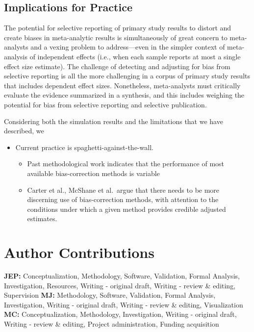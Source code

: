 \documentclass[
  man, donotrepeattitle,floatsintext]{apa7}
\providecommand{\tightlist}{%
  \setlength{\itemsep}{0pt}\setlength{\parskip}{0pt}}
\begin{document}
\subsection{Implications for Practice}\label{implications-for-practice}

The potential for selective reporting of primary study results to distort and create biases in meta-analytic results is simultaneously of great concern to meta-analysts and a vexing problem to address---even in the simpler context of meta-analysis of independent effects (i.e., when each sample reports at most a single effect size estimate).
The challenge of detecting and adjusting for bias from selective reporting is all the more challenging in a corpus of primary study results that includes dependent effect sizes.
Nonetheless, meta-analysts must critically evaluate the evidence summarized in a synthesis, and this includes weighing the potential for bias from selective reporting and selective publication.

Considering both the simulation results and the limitations that we have described, we

\begin{itemize}
\tightlist
\item
  Current practice is spaghetti-against-the-wall.

  \begin{itemize}
  \tightlist
  \item
    Past methodological work indicates that the performance of most available bias-correction methods is variable
  \item
    Carter et al., McShane et al.~argue that there needs to be more discerning use of bias-correction methods, with attention to the conditions under which a given method provides credible adjusted estimates.
  \end{itemize}
\end{itemize}

\section*{Author Contributions}\label{author-contributions}

\textbf{JEP:} Conceptualization, Methodology, Software, Validation, Formal Analysis, Investigation, Resources, Writing - original draft, Writing - review \& editing, Supervision \textbf{MJ:} Methodology, Software, Validation, Formal Analysis, Investigation, Writing - original draft, Writing - review \& editing, Visualization \textbf{MC:} Conceptualization, Methodology, Investigation, Writing - original draft, Writing - review \& editing, Project administration, Funding acquisition
\end{document}
